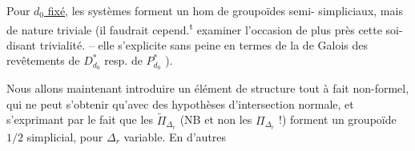 Pour \uline{$d_0$ fixé}, les systèmes
forment un hom de groupoïdes semi-
simpliciaux, mais de nature 
triviale (il faudrait cepend.\textsuperscript{t} examiner
 l'occasion de plus près cette soi-disant
trivialité. --  elle s'explicite sans peine
en termes de la  de Galois
des revêtements de $D^*_{d_0}$ resp. de $P^*_{d_0}$ \unsure{\ldots|--}).

Nous allons maintenant introduire
un élément de structure tout à fait
non-formel, qui ne peut s'obtenir
qu'avec des hypothèses 
d'intersection normale, et s'exprimant
par le fait que les $\widetilde\Pi_{\Delta_r}$ (NB et
non les $\Pi_{\Delta_r}$ !) forment un groupoïde
$1/2$ simplicial, pour $\Delta_r$ variable. En d'autres


